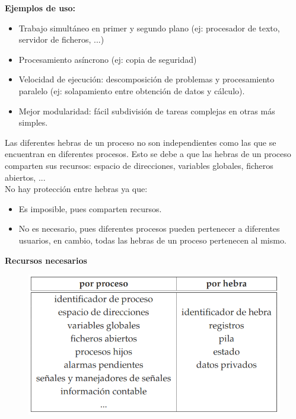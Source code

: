 \documentclass{article}
\begin{document}
\textbf{Ejemplos de uso:}
\begin{itemize}
\item Trabajo simultáneo en primer y segundo plano (ej: procesador de texto, servidor de ficheros, ...)

\item Procesamiento asíncrono (ej: copia de seguridad)

\item Velocidad de ejecución: descomposición de problemas y procesamiento paralelo (ej: solapamiento entre obtención de datos y cálculo).

\item Mejor modularidad: fácil subdivisión de tareas complejas en otras más simples.
\end{itemize}

Las diferentes hebras de un proceso no son independientes como las que se encuentran en diferentes procesos. Esto se debe a que las hebras de un proceso comparten sus recursos: espacio de direcciones, variables globales, ficheros abiertos, ...\\

No hay protección entre hebras ya que:
\begin{itemize}
\item Es imposible, pues comparten recursos.

\item No es necesario, pues diferentes procesos pueden pertenecer a diferentes usuarios, en cambio, todas las hebras de un proceso pertenecen al mismo.
\end{itemize}

\newpage
\textbf{Recursos necesarios}
\begin{figure}[h]
\centering
\includegraphics[scale=1, width=\textwidth]{recursos.png}
\end{figure}
\end{document}
